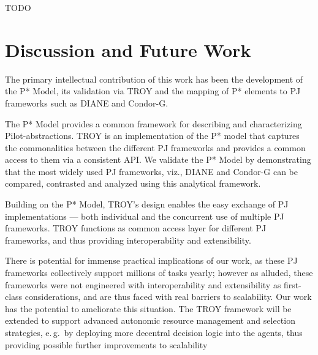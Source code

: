 \documentclass[conference,final]{IEEEtran}
\newcommand{\alnote}[1]{ {\textcolor{blue} { ***andre: #1 }}}
\newcommand{\alnote}[1]{}
\newcommand{\upp}{\vspace*{-0.5em}}
\begin{document}
TODO

% 
% 



\section{Discussion and Future Work \upp\upp}
\label{sec:discussion-future-work}



The primary intellectual contribution of this work has been the
development of the P* Model, its validation via TROY and the mapping
of P* elements to PJ frameworks such as DIANE and Condor-G. 
 
The P* Model provides a common framework for describing and
characterizing Pilot-abstractions. TROY is an implementation of the P*
model that captures the commonalities between the different PJ
frameworks and provides a common access to them via a consistent API.
We validate the P* Model by demonstrating that the most widely used PJ
frameworks, viz., DIANE and Condor-G can be compared, contrasted and
analyzed using this analytical
framework.%

Building on the P* Model, TROY's design enables the easy exchange of
PJ implementations --- both individual and the concurrent use of
multiple PJ frameworks. TROY functions as common access layer for
different PJ frameworks, and thus providing interoperability and
extensibility.

There is potential for immense practical implications of our work, as
these PJ frameworks collectively support millions of tasks yearly;
however as alluded, these frameworks were not engineered with
interoperability and extensibility as first-class considerations, and
are thus faced with real barriers to scalability.  Our work has the
potential to ameliorate this situation.  The TROY framework will be
extended to support advanced autonomic resource management and
selection strategies, e.\,g.\ by deploying more decentral decision
logic into the agents, thus providing possible further improvements to
scalability
\end{document}
